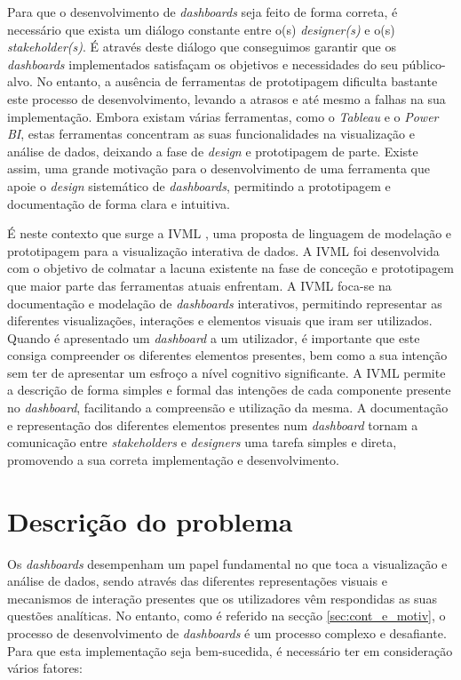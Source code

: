 Para que o desenvolvimento de \textit{dashboards} seja feito de forma correta, é necessário que exista um diálogo constante entre o(s) \textit{designer(s)} e o(s) \textit{stakeholder(s)}. É através deste diálogo que conseguimos garantir que os \textit{dashboards} implementados satisfaçam os objetivos e necessidades do seu público-alvo. No entanto, a ausência de ferramentas de prototipagem dificulta bastante este processo de desenvolvimento, levando a atrasos e até mesmo a falhas na sua implementação. Embora existam várias ferramentas, como o \textit{Tableau} e o \textit{Power BI}, estas ferramentas concentram as suas funcionalidades na visualização e análise de dados, deixando a fase de \textit{design} e prototipagem de parte. Existe assim, uma grande motivação para o desenvolvimento de uma ferramenta que apoie o \textit{design} sistemático de \textit{dashboards}, permitindo a prototipagem e documentação de forma clara e intuitiva.

É neste contexto que surge a \gls{IVML} \cite{Ferreira2023IVML}, uma proposta de linguagem de modelação e prototipagem para a visualização interativa de dados. A \gls{IVML} foi desenvolvida com o objetivo de colmatar a lacuna existente na fase de conceção e prototipagem que maior parte das ferramentas atuais enfrentam. A \gls{IVML} foca-se na documentação e modelação de \textit{dashboards} interativos, permitindo representar as diferentes visualizações, interações e elementos visuais que iram ser utilizados. Quando é apresentado um \textit{dashboard} a um utilizador, é importante que este consiga compreender os diferentes elementos presentes, bem como a sua intenção sem ter de apresentar um esfroço a nível cognitivo significante. A \gls{IVML} permite a descrição de forma simples e formal das intenções de cada componente presente no \textit{dashboard}, facilitando a compreensão e utilização da mesma. A documentação e representação dos diferentes elementos presentes num \textit{dashboard} tornam a comunicação entre \textit{stakeholders} e \textit{designers} uma tarefa simples e direta, promovendo a sua correta implementação e desenvolvimento.

\section{Descrição do problema}
\label{sec:des_problema}

Os \textit{dashboards} desempenham um papel fundamental no que toca a visualização e análise de dados, sendo através das diferentes representações visuais e mecanismos de interação presentes que os utilizadores vêm respondidas as suas questões analíticas. No entanto, como é referido na secção \ref{sec:cont_e_motiv}, o processo de desenvolvimento de \textit{dashboards} é um processo complexo e desafiante. Para que esta implementação seja bem-sucedida, é necessário ter em consideração vários fatores:

